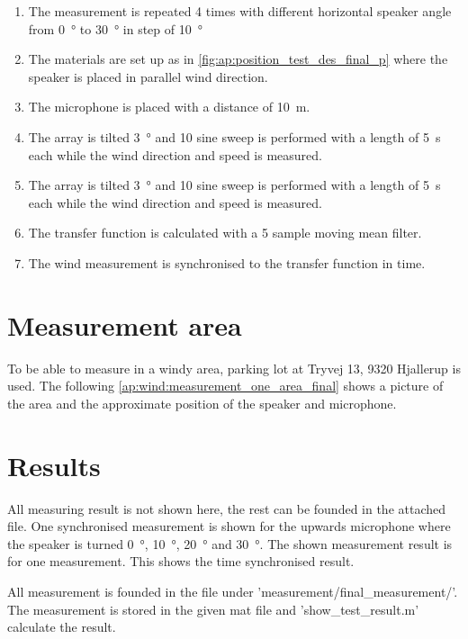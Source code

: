 \begin{enumerate}
\item The measurement is repeated 4 times with different horizontal speaker angle from \SI{0}{\degree} to \SI{30}{\degree} in step of \SI{10}{\degree}
\item The materials are set up as in \autoref{fig:ap:position_test_des_final_p} where the speaker is placed in parallel wind direction.
\item The microphone is placed with a distance of \SI{10}{\meter}.
\item The array is tilted \SI{3}{\degree} and 10 sine sweep is performed with a length of \SI{5}{\second} each while the wind direction and speed is measured.
\item The array is tilted \SI{3}{\degree} and 10 sine sweep is performed with a length of \SI{5}{\second} each while the wind direction and speed is measured.
\item The transfer function is calculated with a 5 sample moving mean filter.
\item The wind measurement is synchronised to the transfer function in time. 
\end{enumerate}


\section*{Measurement area}
To be able to measure in a windy area, parking lot at Tryvej 13, 9320 Hjallerup is used. The following \autoref{ap:wind:measurement_one_area_final} shows a picture of the area and the approximate position of the speaker and microphone.


\section*{Results}

All measuring result is not shown here, the rest can be founded in the attached file. One synchronised measurement is shown for the upwards microphone where the speaker is turned \SI{0}{\degree}, \SI{10}{\degree}, \SI{20}{\degree} and \SI{30}{\degree}. The shown measurement result is for one measurement. This shows the time synchronised result. 






All measurement is founded in the file under 'measurement/final_measurement/'. The measurement is stored in the given mat file and 'show_test_result.m' calculate the result.





